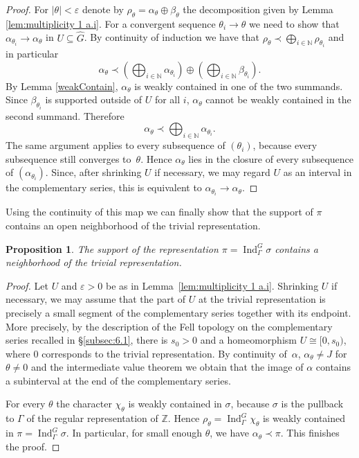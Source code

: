 \documentclass[12pt,reqno]{amsart}
\newcommand{\N}{\mathbb{N}}
\newcommand{\Z}{\mathbb{Z}}
\newtheorem{proposition}[theorem]{Proposition}
\theoremstyle{definition}
\newcommand{\abs}[1]{\left| #1 \right|}
\newcommand{\Ind}{\operatorname{Ind}}
\begin{document}
\begin{proof}
    For $\abs{\theta}<\varepsilon$ denote by $\rho_\theta = \alpha_\theta \oplus \beta_\theta$ the decomposition given by Lemma \ref{lem:multiplicity 1 a.i}. For a convergent sequence $\theta_i \to \theta$ we need to show that $\alpha_{\theta_i} \to \alpha_\theta$ in $U \subseteq \widehat{G}$. By continuity of induction we have that $\rho_\theta \prec \bigoplus_{i\in \N} \rho_{\theta_i}$ and in particular
    \[
        \alpha_\theta \prec
        \left(\bigoplus_{i\in \N} \alpha_{\theta_i}\right)
        \oplus
        \left(\bigoplus_{i\in \N} \beta_{\theta_i}\right).
    \]
    By Lemma \ref{weakContain}, $\alpha_\theta$ is weakly contained in one of the two summands. Since $\beta_{\theta_i}$ is supported outside of $U$ for all $i$, $\alpha_\theta$ cannot be weakly contained in the second summand. Therefore
    \[
        \alpha_\theta \prec \bigoplus_{i\in \N} \alpha_{\theta_i}.
    \]
    The same argument applies to every subsequence of $(\theta_i)$, because every subsequence still converges to~$\theta$. Hence $\alpha_\theta$ lies in the closure of every subsequence of $(\alpha_{\theta_i})$. Since, after shrinking $U$ if necessary, we may regard $U$ as an interval in the complementary series, this is equivalent to $\alpha_{\theta_i}\to\alpha_\theta$.
\end{proof}

Using the continuity of this map we can finally show that the support of $\pi$ contains an open neighborhood of the trivial representation.

\begin{proposition} \label{prop:pi contains the end of the complementary series}
    The support of the representation $\pi=\Ind_\Gamma^G \sigma$ contains a neighborhood of the trivial representation.
\end{proposition}

\begin{proof}
    Let $U$ and $\varepsilon>0$ be as in Lemma~\ref{lem:multiplicity 1 a.i}. Shrinking $U$ if necessary, we may assume that the part of $U$ at the trivial representation is precisely a small segment of the complementary series together with its endpoint. More precisely, by the description of the Fell topology on the complementary series recalled in \S\ref{subsec:6.1}, there is $s_0>0$ and a homeomorphism $U\cong [0,s_0)$, where $0$ corresponds to the trivial representation.
    By continuity of~$\alpha$, $\alpha_\theta\ne J$ for $\theta\ne 0$ and the intermediate value theorem we obtain that the image of $\alpha$ contains a subinterval at the end of the complementary series.

    For every $\theta$ the character $\chi_\theta$ is weakly contained in $\sigma$, because $\sigma$ is the pullback to $\Gamma$ of the regular representation of $\Z$. Hence $\rho_\theta=\Ind_\Gamma^G \chi_\theta$ is weakly contained in $\pi=\Ind_\Gamma^G\sigma$. In particular, for small enough $\theta$, we have $\alpha_\theta \prec \pi$. This finishes the proof.
\end{proof}
\end{document}
